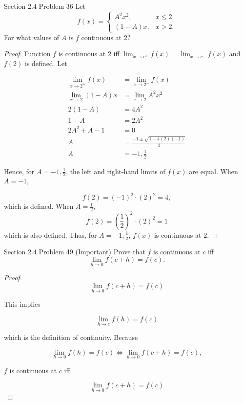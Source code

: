 \documentclass{article}
\begin{document}
    \pagebreak
    \thispagestyle{page4}


    \begin{tbhtheorem}{Section 2.4 Problem 36}
        Let
        \[
            f(x) =
            \begin{cases}
                A^2 x^2,        & x \leq 2 \\
                (1-A) x,        & x > 2.
            \end{cases}
        \]
        For what values of $A$ is $f$ continuous at 2?
    \end{tbhtheorem}

    \begin{proof}
        Function $f$ is continuous at 2 iff $\lim_{x\to c^+} f(x)= \lim_{x\to c^-}f(x)$ and $f(2)$ is defined. Let

        \begin{align*}
            \lim_{x\to 2^+} f(x)        &= \lim_{x\to 2^-}  f(x) \\
            \lim_{x\to 2} (1-A)x        &= \lim_{x\to 2} A^2 x^2 \\
            2(1-A)                      &= 4A^2 \\
            1-A                         &= 2A^2 \\
            2A^2 + A - 1                &= 0 \\
            A                           &= \frac{-1\pm \sqrt{1-4(2)(-1)}}{4} \\
            A                           &= -1, \frac{1}{2}
        \end{align*}

        Hence, for $A=-1,\frac{1}{2}$, the left and right-hand limits of $f(x)$ are equal. When $A=-1$,

        \[
            f(2)    = (-1)^2 \cdot (2)^2 = 4,
        \]
        which is defined. When $A=\frac{1}{2}$,
        \[
            f(2) = \left(\frac{1}{2}\right)^2 \cdot (2)^2 = 1
        \]
        which is also defined. Thus, for $A=-1,\frac{1}{2}$, $f(x)$ is continuous at 2.
    \end{proof}

    \begin{tbhtheorem}{Section 2.4 Problem 49 (Important)}
        Prove that $f$ is continuous at $c$ iff
        \[
            \lim_{h\to 0} f(c+h) = f(c).
        \]
    \end{tbhtheorem}

    \begin{proof}
        \[
            \lim_{h\to 0} f(c+h) = f(c)
        \]

        This implies

        \[
            \lim_{h\to c} f(h) = f(c)
        \]

        which is the definition of continuity. Because

        \[
            \lim_{h\to 0} f(h) = f(c) \iff \lim_{h\to 0} f(c+h) = f(c),
        \]

        $f$ is continuous at $c$ iff

        \[
            \lim_{h\to 0} f(c+h) = f(c)
        \]
    \end{proof}
\end{document}
